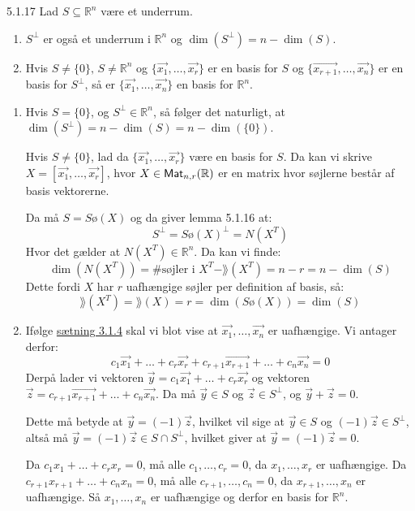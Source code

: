 \begin{saetning}{5.1.17}
	Lad $S \subseteq \mathbb{R}^n$ være et underrum.
	\begin{enumerate}
		\item $S^\bot$ er også et underrum i $\mathbb{R}^n$ og $\dim(S^\bot) =
			n - \dim(S)$.
		\item Hvis $S \not= \{0\},\, S \not= \mathbb{R}^n$ og $\{\vec{x_1}, 
			\dotsc, \vec{x_r}\}$ er en basis for $S$ og $\{\vec{x_{r+1}}, 
			\dotsc, \vec{x_n}\}$ er en basis for $S^\bot$, så er $\{\vec{x_1}, 
			\dotsc, \vec{x_n}\}$ en basis for $\mathbb{R}^n$.
	\end{enumerate}
\end{saetning}

\begin{bevis}
	\begin{enumerate}
		\item Hvis $S = \{0\}$, og $S^\bot \in \mathbb{R}^n$, så følger det 
			naturligt, at $\dim(S^\bot) = n - \dim(S) = n - \dim(\{0\})$.

			Hvis $S \not= \{0\}$, lad da $\{\vec{x_1}, \dotsc, \vec{x_r}\}$ 
			være en basis for $S$. Da kan vi skrive $X = [\vec{x_1}, \dotsc, 
			\vec{x_r}]$, hvor $X \in \textsf{Mat}_{n,r}(\mathbb{R})$ er en matrix 
			hvor søjlerne består af basis vektorerne.

			Da må $S = S\text{ø}(X)$ og da giver lemma 5.1.16 at:
			\[
				S^\bot = S\text{ø}(X)^\bot = N(X^T)
			\]
			Hvor det gælder at $N(X^T) \in \mathbb{R}^n$. Da kan vi finde:
			\[
				\dim(N(X^T)) = \text{\#søjler i } X^T-\rang(X^T) = n-r = 
				n - \dim(S)
			\]
			Dette fordi $X$ har $r$ uafhængige søjler per definition af basis, 
			så:
			\[
				\rang(X^T) = \rang(X) = r = \dim(S\text{ø}(X)) = \dim(S)
			\]
		\item Ifølge \hyperlink{3.1.4}{sætning 3.1.4} skal vi blot vise at 
			$\vec{x_1}, \dotsc, \vec{x_n}$ er uafhængige.
			Vi antager derfor:
			\[
				c_1\vec{x_1} + \dotsc + c_r\vec{x_r} + c_{r+1}\vec{x_{r+1}} + 
				\dotsc + c_n\vec{x_n} = 0
			\]
			Derpå lader vi vektoren $\vec{y} = c_1\vec{x_1} + \dotsc + 
			c_r\vec{x_r}$ og vektoren $\vec{z} = c_{r+1}\vec{x_{r+1}} + 
			\dotsc + c_n\vec{x_n}$. Da må $\vec{y} \in S$ og $\vec{z} \in 
			S^\bot$, og $\vec{y} + \vec{z} = 0$.

			Dette må betyde at $\vec{y} = (-1)\vec{z}$, hvilket vil sige at 
			$\vec{y} \in S$ og $(-1)\vec{z} \in S^\bot$, altså må $\vec{y} = 
			(-1)\vec{z} \in S \cap S^\bot$, hvilket giver at $\vec{y} = 
			(-1)\vec{z} = 0$.

			Da $c_1x_1 + \dotsc + c_rx_r = 0$, må alle $c_1, \dotsc, c_r = 0$,
			da $x_1, \dotsc, x_r$ er uafhængige. Da $c_{r+1}x_{r+1} + \dotsc + 
			c_nx_n = 0$, må alle $c_{r+1}, \dotsc, c_n = 0$, da $x_{r+1}, 
			\dotsc, x_n$ er uafhængige. Så $x_1, \dotsc, x_n$ er uafhængige og
			derfor en basis for $\mathbb{R}^n$.
	\end{enumerate}
\end{bevis}
